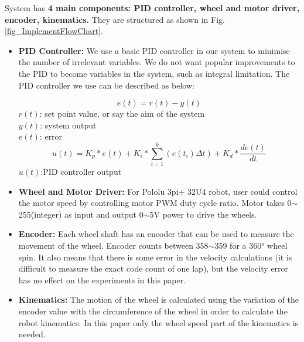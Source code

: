 \documentclass[conference]{IEEEtran}
\begin{document}
System has \textbf{4 main components: PID controller, wheel and motor driver, encoder, kinematics.} They are structured as shown in Fig. \ref{fig_ImplementFlowChart}. 
\begin{itemize}
    \item\textbf{PID Controller: } We use a basic PID controller in our system to minimise the number of irrelevant variables. We do not want popular improvements to the PID to become variables in the system, such as integral limitation. The PID controller we use can be described as below:
    
    
        \begin{equation}\label{PID_1}
            e(t) = r(t) - y(t)      
        \end{equation}
        $r(t)$: set point value, or say the aim of the system\\
        $y(t)$: system output \\
        $e(t)$: error
        \begin{equation}\label{PID_2}
            u(t)=K_{p}*e(t)+K_{i} * \sum_{i=1}^{k}  (e(t_{i})\Delta t)+K_{d} * \frac{de(t)}{dt}
        \end{equation}
        $u(t)$:PID controller output
        \par
    \item\textbf{Wheel and Motor Driver: }For Pololu 3pi+ 32U4 robot, user could control the motor speed by controlling motor PWM duty cycle ratio. Motor takes 0$\sim$255(integer) as input and output 0$\sim$5V power to drive the wheels.
    \item\textbf{Encoder: }Each wheel shaft has an encoder that can be used to measure the movement of the wheel. Encoder counts between 358$\sim$359 for a 360° wheel spin. It also means that there is some error in the velocity calculations (it is difficult to measure the exact code count of one lap), but the velocity error has no effect on the experiments in this paper.
    \item\textbf{Kinematics: }The motion of the wheel is calculated using the variation of the encoder value with the circumference of the wheel in order to calculate the robot kinematics. In this paper only the wheel speed part of the kinematics is needed.

\end{itemize}
\end{document}
